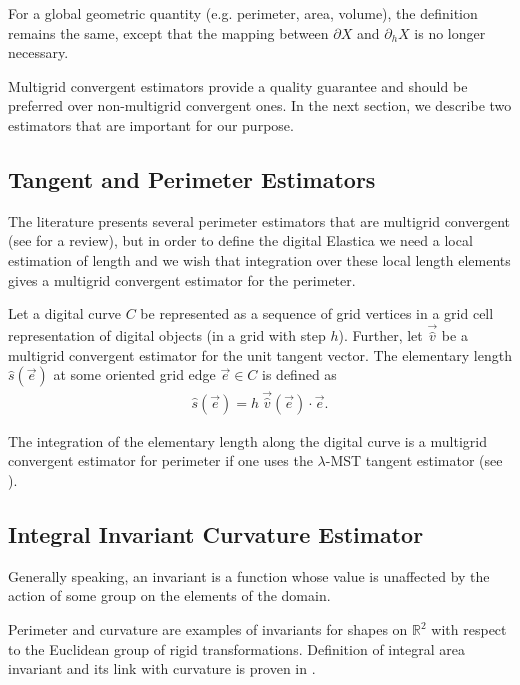 \documentclass[smallextended]{svjour3}       %
\begin{document}
For a global geometric quantity (e.g. perimeter, area, volume), the definition remains the same, except that the mapping
between $\partial X$ and $\partial_h X$ is no longer necessary.
	
Multigrid convergent estimators provide a quality guarantee and should
be preferred over non-multigrid convergent ones. In the next section,
we describe two estimators that are important for our purpose.

\subsection{Tangent and Perimeter Estimators}

The literature presents several perimeter estimators that are multigrid convergent (see
\cite{coeurjolly04comparative,coeurjolly12multigrid} for a review), but in order to define the digital Elastica we need a local estimation
of length and we wish that integration over these local length elements gives a multigrid convergent estimator for the
perimeter.

\begin{definition}
  Let a digital curve $C$ be represented as a sequence of grid vertices in a grid cell representation of digital objects (in a grid with step $h$). Further, let $\vec{ \hat{v} }$ be a multigrid convergent estimator for the unit tangent vector. The elementary length $\hat{s}(\vec{e})$ at some oriented grid edge $ \vec{e} \in C$ is defined as
  \begin{align*}
    \hat{s}(\vec{e}) = h ~\vec{\hat{v}}(\vec{e}) \cdot \vec{e}.
  \end{align*}
\end{definition}
The integration of the elementary length along the digital curve is a multigrid convergent estimator for perimeter if
one uses the $\lambda$-MST \cite{lachaud07tangent} tangent estimator (see \cite{lachaud06hdr}).

\subsection{Integral Invariant Curvature Estimator}
Generally speaking, an invariant is a function whose value is unaffected by the action
of some group on the elements of the domain.

Perimeter and curvature are examples of invariants for shapes on
$\mathbb{R}^2$ with respect to the Euclidean group of rigid
transformations. Definition of integral area invariant and its link
with curvature is proven in \cite{manay04intinvariant}.
\end{document}
